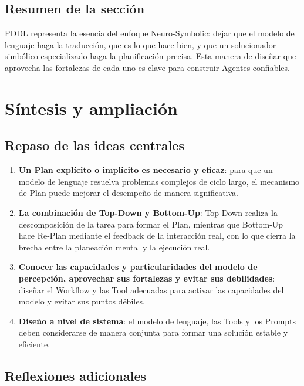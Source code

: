 \documentclass[a4paper]{article}
\begin{document}
\subsection{Resumen de la sección}

PDDL representa la esencia del enfoque Neuro-Symbolic: dejar que el modelo de lenguaje haga la traducción, que es lo que hace bien, y que un solucionador simbólico especializado haga la planificación precisa. Esta manera de diseñar que aprovecha las fortalezas de cada uno es clave para construir Agentes confiables.

\section{Síntesis y ampliación}

\subsection{Repaso de las ideas centrales}

\begin{enumerate}
    \item \textbf{Un Plan explícito o implícito es necesario y eficaz}: para que un modelo de lenguaje resuelva problemas complejos de ciclo largo, el mecanismo de Plan puede mejorar el desempeño de manera significativa.
    \item \textbf{La combinación de Top-Down y Bottom-Up}: Top-Down realiza la descomposición de la tarea para formar el Plan, mientras que Bottom-Up hace Re-Plan mediante el feedback de la interacción real, con lo que cierra la brecha entre la planeación mental y la ejecución real.
    \item \textbf{Conocer las capacidades y particularidades del modelo de percepción, aprovechar sus fortalezas y evitar sus debilidades}: diseñar el Workflow y las Tool adecuadas para activar las capacidades del modelo y evitar sus puntos débiles.
    \item \textbf{Diseño a nivel de sistema}: el modelo de lenguaje, las Tools y los Prompts deben considerarse de manera conjunta para formar una solución estable y eficiente.
\end{enumerate}

\subsection{Reflexiones adicionales}
\end{document}
